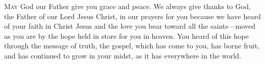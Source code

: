
\lettrine{M}{ay} God our Father give you grace and peace. We always give thanks to God, the Father of our Lord Jesus Christ, in our prayers for you because we have heard of your faith in Christ Jesus and the love you bear toward all the saints—moved as you are by the hope held in store for you in heaven. You heard of this hope through the message of truth, the gospel, which has come to you, has borne fruit, and has continued to grow in your midst, as it has everywhere in the world.